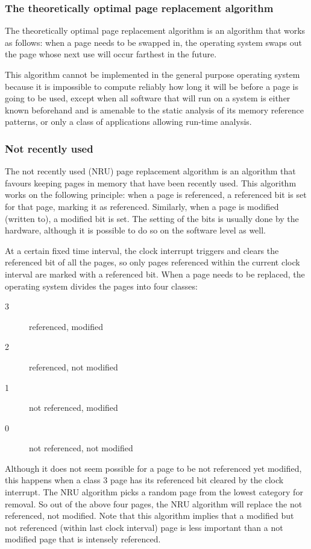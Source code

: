 \documentclass[a4paper, twoside]{article}
\begin{document}
\subsubsection{The theoretically optimal page replacement algorithm}
The theoretically optimal page replacement algorithm is an algorithm that works as follows: when a page needs to be swapped in, the operating system swaps out the page whose next use will occur farthest in the future.

This algorithm cannot be implemented in the general purpose operating system because it is impossible to compute reliably how long it will be before a page is going to be used, except when all software that will run on a system is either known beforehand and is amenable to the static analysis of its memory reference patterns, or only a class of applications allowing run-time analysis.

\subsubsection{Not recently used}
The not recently used (NRU) page replacement algorithm is an algorithm that favours keeping pages in memory that have been recently used. This algorithm works on the following principle: when a page is referenced, a referenced bit is set for that page, marking it as referenced. Similarly, when a page is modified (written to), a modified bit is set. The setting of the bits is usually done by the hardware, although it is possible to do so on the software level as well.

At a certain fixed time interval, the clock interrupt triggers and clears the referenced bit of all the pages, so only pages referenced within the current clock interval are marked with a referenced bit. When a page needs to be replaced, the operating system divides the pages into four classes:
\begin{description}
	\item[3] referenced, modified
	\item[2] referenced, not modified
	\item[1] not referenced, modified
	\item[0] not referenced, not modified
\end{description}

Although it does not seem possible for a page to be not referenced yet modified, this happens when a class 3 page has its referenced bit cleared by the clock interrupt. The NRU algorithm picks a random page from the lowest category for removal. So out of the above four pages, the NRU algorithm will replace the not referenced, not modified. Note that this algorithm implies that a modified but not referenced (within last clock interval) page is less important than a not modified page that is intensely referenced.
\end{document}
